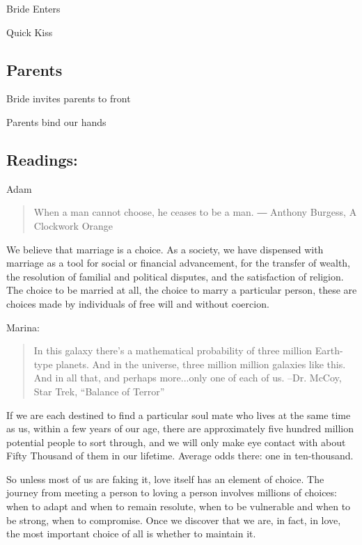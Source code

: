 \documentclass[twoside]{article}
\begin{document}
      Bride Enters
  		
      Quick Kiss
	  
    \subsection{Parents} 
     
     Bride invites parents to front
     
     Parents bind our hands

  	\subsection{Readings:}

      \begin{center}
        Adam
      \end{center}
      \begin{quote}
        When a man cannot choose, he ceases to be a man.
        ― Anthony Burgess, A Clockwork Orange
      \end{quote}

We believe that marriage is a choice. As a society, we have dispensed with marriage as a tool for social or financial advancement, for the transfer of wealth, the resolution of familial and political disputes, and the satisfaction of religion. The choice to be married at all, the choice to marry a particular person, these are choices made by individuals of free will and without coercion. 

      \begin{center}
        Marina:
      \end{center}
      \begin{quote}
        In this galaxy there’s a mathematical probability of three million Earth-type planets. And in the universe, three million million galaxies like this. And in all that, and perhaps more...only one of each of us.
        --Dr. McCoy, Star Trek, “Balance of Terror”
      \end{quote}

If we are each destined to find a particular soul mate who lives at the same time as us, within a few years of our age, there are approximately five hundred million potential people to sort through, and we will only make eye contact with about Fifty Thousand of them in our lifetime. Average odds there: one in ten-thousand. 

So unless most of us are faking it, love itself has an element of choice. The journey from meeting a person to loving a person involves millions of choices: when to adapt and when to remain resolute, when to be vulnerable and when to be strong, when to compromise. Once we discover that we are, in fact, in love, the most important choice of all is whether to maintain it. 
	
\end{document}
